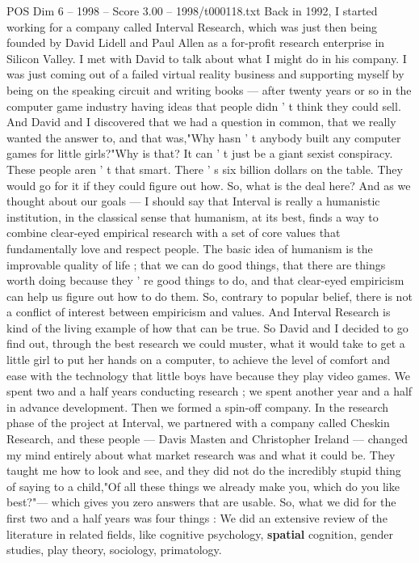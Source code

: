 \begin{textsample}{POS Dim 6 – 1998 – Score 3.00 – 1998/t000118.txt}  \label{ex:f6_pos_014}
Back in 1992, I started working for a company called Interval Research, which was just then being founded by David Lidell and Paul Allen as a for-profit research enterprise in Silicon Valley.
I met with David to talk about what I might do in his company.
I was just coming out of a failed virtual reality business and supporting myself by being on the speaking circuit and writing books — after twenty years or so in the computer game industry having ideas that people didn ' t think they could sell.
And David and I discovered that we had a question in common, that we really wanted the answer to, and that was,"Why hasn ' t anybody built any computer games for little girls?"Why is that?
It can ' t just be a giant sexist conspiracy.
These people aren ' t that smart.
There ' s six billion dollars on the table.
They would go for it if they could figure out how.
So, what is the deal here?
And as we thought about our goals — I should say that Interval is really a humanistic institution, in the classical sense that humanism, at its best, finds a way to combine clear-eyed empirical research with a set of core values that fundamentally love and respect people.
The basic idea of humanism is the improvable quality of life ; that we can do good things, that there are things worth doing because they ' re good things to do, and that clear-eyed empiricism can help us figure out how to do them.
So, contrary to popular belief, there is not a conflict of interest between empiricism and values.
And Interval Research is kind of the living example of how that can be true.
So David and I decided to go find out, through the best research we could muster, what it would take to get a little girl to put her hands on a computer, to achieve the level of comfort and ease with the technology that little boys have because they play video games.
We spent two and a half years conducting research ; we spent another year and a half in advance development.
Then we formed a spin-off company.
In the research phase of the project at Interval, we partnered with a company called Cheskin Research, and these people — Davis Masten and Christopher Ireland — changed my mind entirely about what market research was and what it could be.
They taught me how to look and see, and they did not do the incredibly stupid thing of saying to a child,"Of all these things we already make you, which do you like best?"— which gives you zero answers that are usable.
So, what we did for the first two and a half years was four things : We did an extensive review of the literature in related fields, like cognitive psychology, \textbf{spatial} cognition, gender studies, play theory, sociology, primatology.

\end{textsample}
